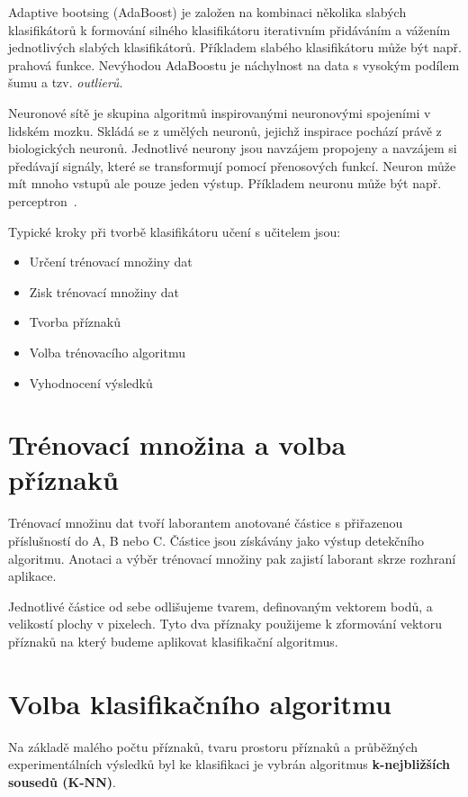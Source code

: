 \documentclass[11pt,twoside,a4paper,table]{book}
\begin{document}
Adaptive bootsing (AdaBoost) je založen na kombinaci několika slabých klasifikátorů k formování silného klasifikátoru iterativním přidáváním a vážením jednotlivých slabých klasifikátorů. Příkladem slabého klasifikátoru může být např. prahová funkce. Nevýhodou AdaBoostu je náchylnost na data s vysokým podílem šumu a tzv. \textit{outlierů}.

Neuronové sítě je skupina algoritmů inspirovanými neuronovými spojeními v lidském mozku. Skládá se z umělých neuronů, jejichž inspirace pochází právě z biologických neuronů. Jednotlivé neurony jsou navzájem propojeny a navzájem si předávají signály, které se transformují pomocí přenosových funkcí. Neuron může mít mnoho vstupů ale pouze jeden výstup. Příkladem neuronu může být např. perceptron~\cite{art:neural_networks}. 

Typické kroky při tvorbě klasifikátoru učení s učitelem jsou:
\begin{itemize}
\item Určení trénovací množiny dat
\item Zisk trénovací množiny dat
\item Tvorba příznaků
\item Volba trénovacího algoritmu
\item Vyhodnocení výsledků
\end{itemize}

\section{Trénovací množina a volba příznaků}
Trénovací množinu dat tvoří laborantem anotované částice s přiřazenou příslušností do A, B nebo C. Částice jsou získávány jako výstup detekčního algoritmu. Anotaci a výběr trénovací množiny pak zajistí laborant skrze rozhraní aplikace.

Jednotlivé částice od sebe odlišujeme tvarem, definovaným vektorem bodů, a velikostí plochy v pixelech. Tyto dva příznaky použijeme k zformování vektoru příznaků na který budeme aplikovat klasifikační algoritmus.

\section{Volba klasifikačního algoritmu}

Na základě malého počtu příznaků, tvaru prostoru příznaků a průběžných experimentálních výsledků byl ke klasifikaci je vybrán algoritmus \textbf{k-nejbližších sousedů (K-NN)}.
\end{document}
